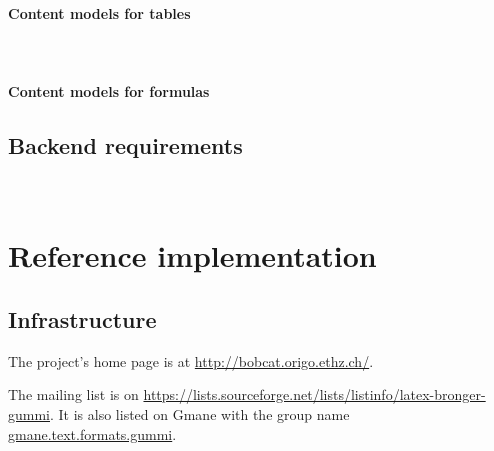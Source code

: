 \documentclass[12pt,openany]{book}
\begin{document}
~

\begin{attributes}
\end{attributes}




~


~

\subsubsection{Content models for tables}

~

\subsubsection{Content models for formulas}

\begin{attributes}
\end{attributes}

\section{Backend requirements}

~


\chapter{Reference implementation}

\section{Infrastructure}

The project's home page is at \url{http://bobcat.origo.ethz.ch/}.

The mailing list is on
\url{https://lists.sourceforge.net/lists/listinfo/latex-bronger-gummi}.  It is
also listed on Gmane with the group name \url{gmane.text.formats.gummi}.
\end{document}
